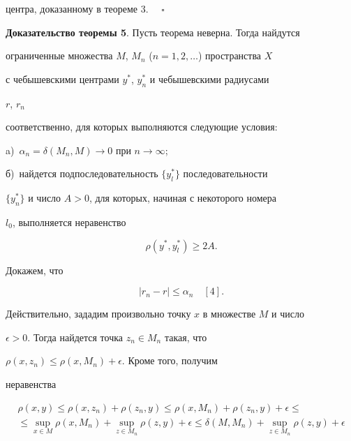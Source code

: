 центра, доказанному в теореме 3. $\quad\square$


\medskip


 


{\bf Доказательство теоремы 5}. Пусть теорема неверна. Тогда найдутся


ограниченные множества $M$, $M_{n}$ ($n = 1,2,\dotsc$) пространства $X$


с чебышевскими центрами $y^{*}$, $y^{*}_{n}$ и чебышевскими радиусами


$r$, $r_{n}$


соответственно, для которых выполняются следующие условия: 


a)~$\alpha_{n} = \delta(M_{n},M) \to 0$ при $n \to \infty$; 


б)~найдется подпоследовательность $\{y^{*}_{l}\}$ последовательности


$\{y^{*}_{n}\}$ и число $A > 0$, для которых, начиная с некоторого номера


$l_{0}$, выполняется неравенство


\begin{equation}


\rho(y^{*},y^{*}_{l}) \geq 2A.


\end{equation}





Докажем, что


\begin{equation}


|r_{n} - r| \leq \alpha_{n} \quad [4].


\end{equation}


Действительно, зададим произвольно точку $x$ в множестве $M$ и число


$\epsilon > 0$. Тогда найдется точка $z_{n} \in M_{n}$ такая, что


$\rho(x,z_{n}) \leq \rho(x,M_{n}) + \epsilon $. Кроме того, получим


неравенства


\begin{multline*}


\rho(x,y) \leq \rho(x,z_{n}) + \rho(z_{n},y) \leq \rho(x,M_{n}) +


\rho(z_{n},y) + \epsilon \leq \\


\le \sup\limits_{x \in M}{\rho(x,M_{n})}


+ \sup\limits_{z \in M_{n}}{\rho(z,y)} + \epsilon \leq


\delta(M,M_{n}) + \sup\limits_{z \in M_{n}}{\rho(z,y)} + \epsilon


\end{multline*}


